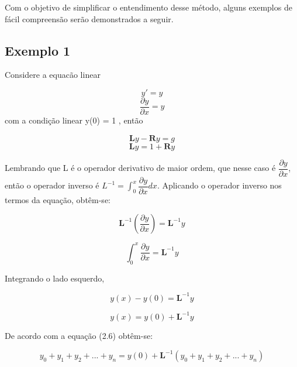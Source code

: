  Com o objetivo de simplificar o entendimento desse método, alguns exemplos de fácil compreensão serão demonstrados a seguir.
 
 \subsection{Exemplo 1}
 
 Considere a equacão linear
 
 \begin{equation*}
 y' = y 
  \end{equation*}
   \begin{equation*}
 \dfrac{\partial y}{\partial x} = y
 \end{equation*}
com a condição linear y(0) = 1 , então

\begin{equation*}
 \textbf{L}y - \textbf{R}y = g
  \end{equation*}
  \begin{equation*}
 \textbf{L}y = 1 + \textbf{R}y 
  \end{equation*}
  
  Lembrando que L é o operador derivativo de maior ordem, que nesse caso é $\dfrac{\partial y}{\partial x}$, então o operador inverso é $L^{-1}=\int_0^{x}\dfrac{\partial y}{\partial x} dx$. Aplicando o operador inverso nos termos da equação, obtêm-se:

\begin{equation*}
 \textbf{L}^{-1}\left(\dfrac{\partial y}{\partial x}\right) = \textbf{L}^{-1} y
  \end{equation*}
  
  \begin{equation*}
  \int_0^{x}\dfrac{\partial y}{\partial x} = \textbf{L}^{-1} y
\end{equation*} 

Integrando o lado esquerdo,

 \begin{equation*}
  y(x) - y(0) = \textbf{L}^{-1} y
\end{equation*} 

 \begin{equation*}
  y(x) = y(0) + \textbf{L}^{-1} y
\end{equation*} 
 
 De acordo com a equação (2.6) obtêm-se:
 
  \begin{equation*}
  y_{0} +y_{1} + y_{2} + ... + y_{n}  = y(0) + \textbf{L}^{-1}( y_{0} +y_{1} + y_{2} + ... + y_{n})
\end{equation*}

